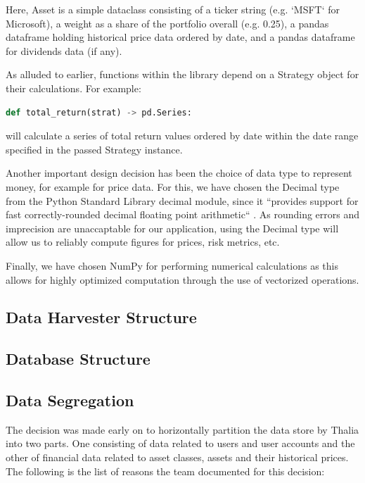 \documentclass[main.tex]{subfiles}
\begin{document}
Here, Asset is a simple dataclass consisting of a ticker string (e.g. `MSFT` for Microsoft), a weight as a share of the portfolio overall (e.g. 0.25), a pandas dataframe holding historical price data ordered by date, and a pandas dataframe for dividends data (if any).

As alluded to earlier, functions within the library depend on a Strategy object for their calculations. For example:

\begin{lstlisting}[language=Python, caption=setup.py - Development environment, label=lst:Development_env]
def total_return(strat) -> pd.Series:
\end{lstlisting}
will calculate a series of total return values ordered by date within the date range specified in the passed Strategy instance.

Another important design decision has been the choice of data type to represent money, for example for price data. For this, we have chosen the Decimal type from the Python Standard Library decimal module, since it ``provides support for fast correctly-rounded decimal floating point arithmetic`` \cite{PyDecimal}. As rounding errors and imprecision are unaccaptable for our application, using the Decimal type will allow us to reliably compute figures for prices, risk metrics, etc.

Finally, we have chosen NumPy \cite{walt2011numpy} for performing numerical calculations as this allows for highly optimized computation through the use of vectorized operations.

\subsection{Data Harvester Structure}


\subsection{Database Structure}
\label{DB Structure}

\subsection{Data Segregation}

The decision was made early on to horizontally partition the data store by Thalia into two parts. One consisting of data related to users and user accounts and the other of financial data related to asset classes, assets and their historical prices. The following is the list of reasons the team documented for this decision:
\end{document}
